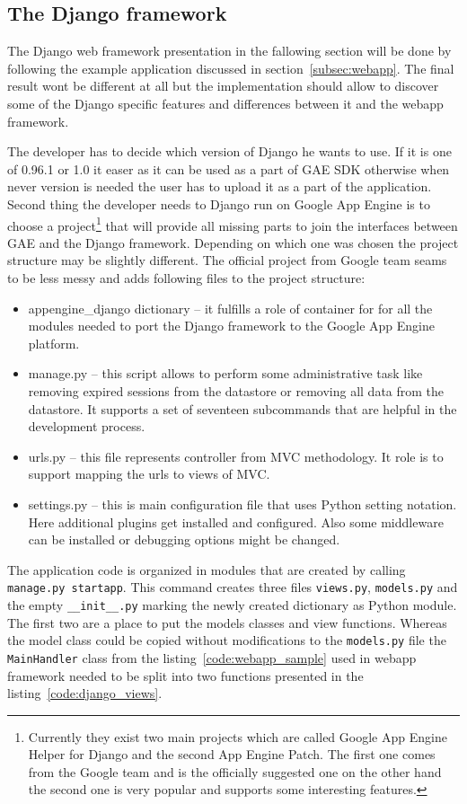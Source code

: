 \subsection{The Django framework}\label{subsec:django}
The Django web framework presentation in the fallowing section will be done by following the example  application discussed in section~\ref{subsec:webapp}. The final result wont be different at all but the implementation should allow to discover some of the Django specific features and differences between it and the webapp framework. 

The developer has to decide which version of Django he wants to use. If it is one of  0.96.1 or 1.0 it easer as it can be used as a part of GAE SDK otherwise when never version is needed the user has to upload it as a part of the application. Second thing the developer needs to Django run on Google App Engine is to choose a project\footnote{Currently they exist two main projects which are called Google App Engine Helper for Django and the second App Engine Patch. The first one comes from the Google team and is the officially suggested one on the other hand the second one is very popular and supports some interesting features.} that will provide all missing parts to join the interfaces between GAE and the Django framework. Depending on which one was chosen the project structure may be slightly different. The official project from Google team seams to be less messy and adds following files to the project structure:
\begin{itemize}
\item{appengine\_django dictionary -- it fulfills a role of container for for all the modules needed to port the Django framework to the Google App Engine platform.}
\item{manage.py -- this script allows to perform some administrative task like  removing expired sessions from the datastore or removing all data from the datastore. It supports a set of seventeen subcommands that are helpful in the development process.}
\item{urls.py -- this file represents controller from MVC methodology. It role is to support mapping the urls to views of MVC.}
\item{settings.py -- this is main configuration file that uses Python setting notation. Here additional plugins get installed and configured. Also some middleware can be installed or debugging options might be changed.}
\end{itemize}
The application code is organized in modules that are created by calling \texttt{manage.py startapp}. This command creates three files \texttt{views.py}, \texttt{models.py} and the empty \texttt{\_\_init\_\_.py} marking the newly created dictionary as Python module.  The first two are a place to put the models classes and view functions. Whereas the model class could be copied without modifications to the \texttt{models.py} file the \texttt{MainHandler} class from the listing~\ref{code:webapp_sample} used in webapp framework needed to be split into two functions presented in the listing~\ref{code:django_views}.
